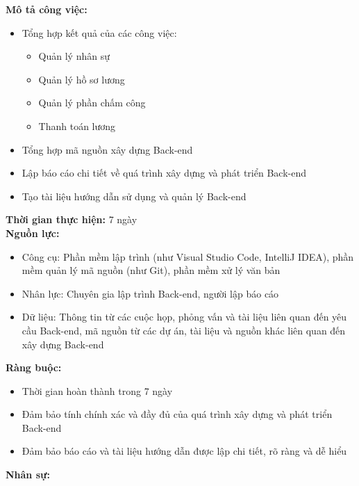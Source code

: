 {\begin{minipage}{\textwidth}
\begin{itemize}
    \end{itemize}
    \vspace{0.5cm}
    \noindent \textbf{Mô tả công việc:}
    \begin{itemize}
        \item Tổng hợp kết quả của các công việc:
        \begin{itemize}
            \item Quản lý nhân sự
            \item Quản lý hồ sơ lương
            \item Quản lý phần chấm công
            \item Thanh toán lương
        \end{itemize}
        \item Tổng hợp mã nguồn xây dựng Back-end
        \item Lập báo cáo chi tiết về quá trình xây dựng và phát triển Back-end
        \item Tạo tài liệu hướng dẫn sử dụng và quản lý Back-end
    \end{itemize}
    \vspace{0.5cm}
    \noindent \textbf{Thời gian thực hiện:} 7 ngày \\
    \noindent \textbf{Nguồn lực:}
    \begin{itemize}
        \item Công cụ: Phần mềm lập trình (như Visual Studio Code, IntelliJ IDEA), phần mềm quản lý mã nguồn (như Git), phần mềm xử lý văn bản
        \item Nhân lực: Chuyên gia lập trình Back-end, người lập báo cáo
        \item Dữ liệu: Thông tin từ các cuộc họp, phỏng vấn và tài liệu liên quan đến yêu cầu Back-end, mã nguồn từ các dự án, tài liệu và nguồn khác liên quan đến xây dựng Back-end
    \end{itemize}
    \vspace{0.5cm}
    \noindent \textbf{Ràng buộc:}
    \begin{itemize}
        \item Thời gian hoàn thành trong 7 ngày
        \item Đảm bảo tính chính xác và đầy đủ của quá trình xây dựng và phát triển Back-end
        \item Đảm bảo báo cáo và tài liệu hướng dẫn được lập chi tiết, rõ ràng và dễ hiểu
    \end{itemize}
    \vspace{0.5cm}
    \noindent \textbf{Nhân sự:}
    \begin{longtable}{|c|c|}

\end{longtable}
\end{minipage}}
